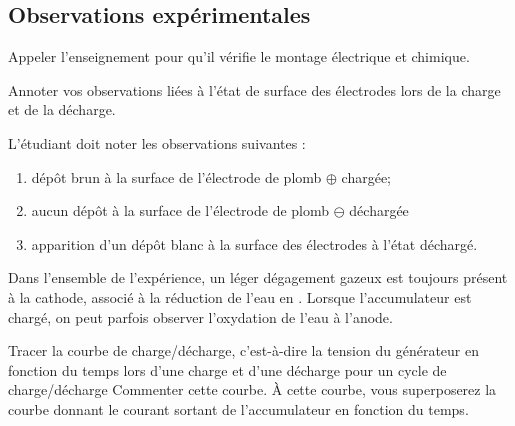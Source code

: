 \documentclass[twoside,a4paper,11pt,answers,addpoints]{exam}
\newcounter{foo} %
\begin{document}
\subsection{Observations expérimentales}

\begin{questions}
\setcounter{question}{\thefoo}

\question[\half] Appeler l'enseignement pour qu'il vérifie le montage électrique et chimique.

\begin{framed}

\question[1] Annoter vos observations liées à l'état de surface des électrodes lors de la charge et de la décharge.

\begin{solution}
L'étudiant doit noter les observations suivantes : 
\begin{enumerate}
\item dépôt brun à la surface de l'électrode de plomb $\oplus$ chargée;
\item aucun dépôt à la surface de l'électrode de plomb $\ominus$ déchargée
\item apparition d'un dépôt blanc à la surface des électrodes à l'état déchargé.
\end{enumerate}

Dans l'ensemble de l'expérience, un léger dégagement gazeux est toujours présent à la cathode, associé à la réduction de l'eau en . Lorsque l'accumulateur est chargé, on peut parfois observer l'oxydation de l'eau à l'anode.

\end{solution}
\end{framed}

\begin{framed}
\question[2] Tracer la courbe de charge/décharge, c'est-à-dire la tension du générateur en fonction du temps lors d'une charge et d'une décharge pour un cycle de charge/décharge Commenter cette courbe. \`{A} cette courbe, vous superposerez la courbe donnant le courant sortant de l'accumulateur en fonction du temps.


\end{framed}
\end{questions}
\end{document}
